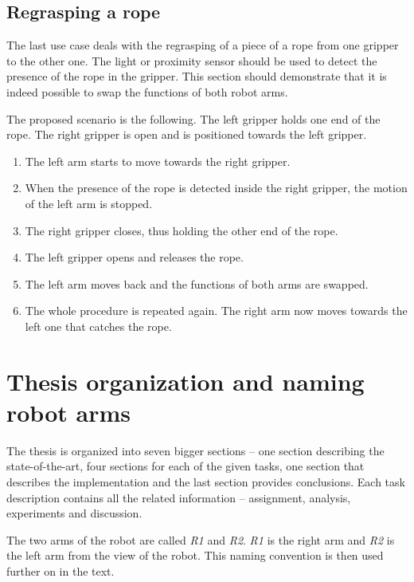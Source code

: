         \subsection{Regrasping a rope}
            The last use case deals with the regrasping of a piece of a rope from one gripper to the other one. The light or proximity sensor should be used to detect the presence of the rope in the gripper. This section should demonstrate that it is indeed possible to swap the functions of both robot arms.

            The proposed scenario is the following. The left gripper holds one end of the rope. The right gripper is open and is positioned towards the left gripper.
%
            \begin{enumerate}
                \item The left arm starts to move towards the right gripper.
                \item When the presence of the rope is detected inside the right gripper, the motion of the left arm is stopped.
                \item The right gripper closes, thus holding the other end of the rope.
                \item The left gripper opens and releases the rope.
                \item The left arm moves back and the functions of both arms are swapped.
                \item The whole procedure is repeated again. The right arm now moves towards the left one that catches the rope.
            \end{enumerate}



    \section{Thesis organization and naming robot arms}
        The thesis is organized into seven bigger sections -- one section describing the state-of-the-art, four sections for each of the given tasks, one section that describes the implementation and the last section provides conclusions. Each task description contains all the related information -- assignment, analysis, experiments and discussion.

        The two arms of the \CloPeMa\/ robot are called \textit{R1} and \textit{R2}. \textit{R1} is the right arm and \textit{R2} is the left arm from the view of the robot. This naming convention is then used further on in the text.

\clearpage 